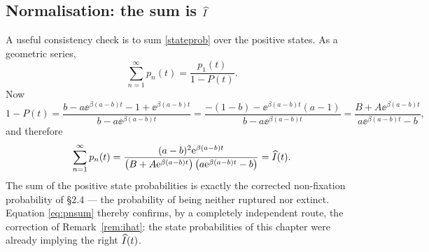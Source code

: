 \subsection{Normalisation: the sum is $\widehat{I}$}
\label{sec:sum-ihat}

A useful consistency check is to sum \eqref{stateprob} over the positive
states. As a geometric series,
$$
\sum_{n=1}^{\infty}p_n(t)
=\frac{p_1(t)}{1-P(t)}.
$$
Now
$$
1-P(t)=\frac{b-a\ee^{\beta(a-b)t}-1+\ee^{\beta(a-b)t}}{b-a\ee^{\beta(a-b)t}}
=\frac{-(1-b)-\ee^{\beta(a-b)t}(a-1)}{b-a\ee^{\beta(a-b)t}}
=\frac{B+A\ee^{\beta(a-b)t}}{a\ee^{\beta(a-b)t}-b},
$$
and therefore
\begin{equation}
\sum_{n=1}^{\infty}p_n(t)
=\frac{(a-b)^2{\rm e}^{\beta(a-b)t}}
{\left( B+A{\rm e}^{\beta(a-b)t}\right)\left( a{\rm e}^{\beta(a-b)t}-b\right)}
=\widehat{I}(t).
\label{eq:pnsum}
\end{equation}
The sum of the positive state probabilities is exactly the corrected
non-fixation probability of \S2.4 --- the probability of being neither
ruptured nor extinct. Equation \eqref{eq:pnsum} thereby confirms, by a
completely independent route, the correction of Remark~\ref{rem:ihat}: the
state probabilities of this chapter were already implying the right
$\widehat{I}(t)$.
